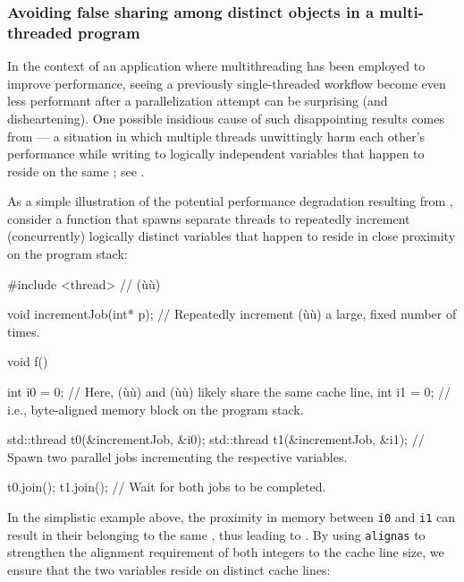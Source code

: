 \subsubsection[Avoiding false sharing among distinct objects in a multi-threaded program]{Avoiding false sharing among distinct objects in a multi-threaded program}\label{avoiding-false-sharing-among-distinct-objects-in-a-multi-threaded-program}

In the context of an application where multithreading has been employed
to improve performance, seeing
a previously single-threaded workflow become even less performant after
a parallelization attempt can be surprising (and disheartening). One possible insidious cause of such
disappointing results comes from  --- a situation
in which multiple threads unwittingly harm each other's performance
while writing to logically independent variables that happen to reside
on the same ; see .

As a simple illustration of the potential
performance degradation resulting from , consider
a function that spawns separate threads to repeatedly increment
(concurrently) logically distinct variables that happen to reside in
close proximity on the program stack:

\begin{emcppslisting}
#include <thread>  // (ù{}ù)

void incrementJob(int* p);
    // Repeatedly increment (ù{}ù) a large, fixed number of times.

void f()
{
    int i0 = 0;  // Here, (ù{}ù) and (ù{}ù) likely share the same cache line,
    int i1 = 0;  // i.e., byte-aligned memory block on the program stack.

    std::thread t0(&incrementJob, &i0);
    std::thread t1(&incrementJob, &i1);
        // Spawn two parallel jobs incrementing the respective variables.

    t0.join();
    t1.join();
        // Wait for both jobs to be completed.
}
\end{emcppslisting}

\noindent In the simplistic example above, the proximity in memory between
\lstinline!i0! and \lstinline!i1! can result in their belonging to the same
, thus leading to . By
using \lstinline!alignas! to strengthen the alignment requirement of both integers to the cache line size, we
ensure that the two variables reside on distinct cache lines:

